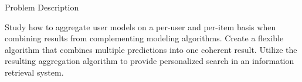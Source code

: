 \null\vspace{15em}
{
  \centering
  \normalfont
  \huge
  Problem Description\\
}
\vspace{2em}

\noindent
Study how to aggregate user models on a per-user and per-item
basis when combining results from complementing modeling algorithms.
Create a flexible algorithm that combines multiple predictions
into one coherent result.
Utilize the resulting aggregation algorithm
to provide personalized search in an information retrieval system.

\cleardoublepage
